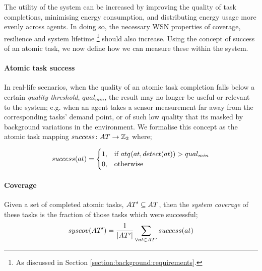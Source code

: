The utility of the system can be increased by improving the quality of task completions, minimising energy consumption, and distributing energy usage more evenly across agents. In doing so, the necessary WSN properties of coverage, resilience and system lifetime \footnote{As discussed in Section \ref{section:background:requirements}.} should also increase. Using the concept of success of an atomic task, we now define how we can measure these within the system.

\newcommand{\varQualityMin}[2]{qual_{min}}

\newcommand{\formalAtomicTaskSuccess}[2]{
	\functionFormal{success}
	{\setAtomicTask{}{}}
	{\setIntegersBinary{}{}}
}
\newcommand{\functionAtomicTaskSuccess}[2]{
	\functionSignature{success}{\varAtomicTask{#1}{#2}}
}

\newcommand{\formalCompositeTaskCoverage}[2]{
	\functionFormal{taskcov}
	{\setCompositeTask{}{}}
	{\setRealNumbersUnit{}{}}
}
\newcommand{\functionCompositeTaskCoverage}[2]{
	\functionSignature{taskcov}{\varCompositeTask{}{}}
}


\newcommand{\functionSystemCoverage}[2]{
	\functionSignature{syscov}{\setAtomicTaskInstance{}{}}
}

\paragraph{Atomic task success}
\label{section:success}
In real-life scenarios, when the quality of an atomic task completion falls below a certain \textit{quality threshold}, $\varQualityMin{}{}$, the result may no longer be useful or relevant to the system; e.g. when an agent takes a sensor measurement far away from the corresponding tasks' demand point, or of such low quality that its masked by background variations in the environment.  We formalise this concept as the atomic task mapping $\formalAtomicTaskSuccess{}{}$ where;

\begin{equation}
	 \functionAtomicTaskSuccess{}{}
	 = 
	\begin{cases}
		1, & \text{if } \functionAtomicTaskQualitySensor{}{} > \varQualityMin{}{} \\
		0, & \text{otherwise}
	\end{cases}
\end{equation}

\paragraph{Coverage}
\label{section:coverage}
Given a set of completed atomic tasks, $\setAtomicTaskInstance{}{} \subseteq \setAtomicTask{}{}$, then the \textit{system coverage} of these tasks is the fraction of those tasks which were successful;
\begin{equation}
	\label{eq:coverage}
	\functionSystemCoverage{}{}
	=
	\frac{1}{\funcSize{\setAtomicTaskInstance{}{}}}
	\sum\limits_{\forall \varAtomicTask{}{} \in \setAtomicTaskInstance{}{}}
	\functionAtomicTaskSuccess{}{}
\end{equation}


